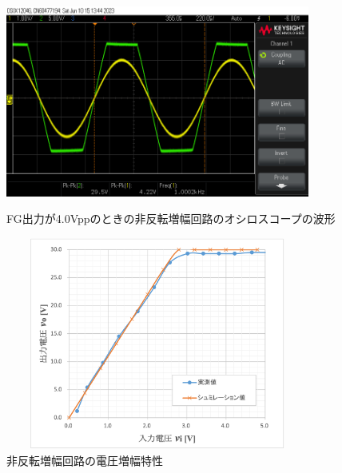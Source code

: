 \documentclass[a4j,10pt,dvipdfmx]{jarticle}
\begin{document}
\begin{figure}[H]
  \begin{center}
  \includegraphics[height=7cm,width=10cm]{hihanten_4Vpp.png}
  \caption{FG出力が4.0Vppのときの非反転増幅回路のオシロスコープの波形}
\end{center}
\end{figure}
\begin{figure}[H]
  \begin{center}
  \includegraphics[height=7cm,width=10cm]{hihanpukugurafu.png}
  \caption{非反転増幅回路の電圧増幅特性}
\end{center}
\end{figure}
\end{document}
